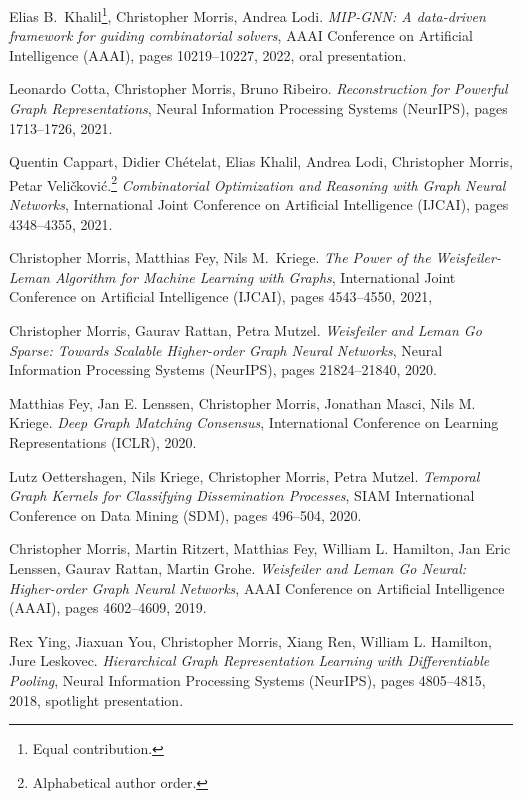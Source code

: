\documentclass[11pt, a4paper, DIV=14, headings=small]{scrartcl}
\begin{document}
\begin{thebibliography}{15}
		Elias B.\, Khalil\footnote{Equal contribution.}, Christopher Morris{\footnotemark[1]}, Andrea Lodi.
		\emph{MIP-GNN: A data-driven framework for guiding combinatorial solvers},
		AAAI Conference on Artificial Intelligence (AAAI), pages 10219--10227, 2022, oral presentation.
		
		Leonardo Cotta, Christopher Morris, Bruno Ribeiro.
		\emph{Reconstruction for Powerful Graph Representations},
		Neural Information Processing Systems (NeurIPS), pages 1713--1726, 2021.
		
		Quentin Cappart, Didier Chételat, Elias Khalil, Andrea Lodi, Christopher Morris, Petar Veli\v{c}kovi\'{c}.\footnote{Alphabetical author order.}
		\emph{Combinatorial Optimization and Reasoning with Graph Neural Networks},
		International Joint Conference on Artificial Intelligence (IJCAI), pages 4348--4355, 2021.
		
		Christopher Morris, Matthias Fey, Nils M.~Kriege.
		\emph{The Power of the Weisfeiler-Leman Algorithm for Machine Learning with Graphs},
		International Joint Conference on Artificial Intelligence (IJCAI), pages 4543--4550, 2021,
		
		Christopher Morris, Gaurav Rattan, Petra Mutzel.
		\emph{Weisfeiler and Leman Go Sparse: Towards Scalable Higher-order Graph Neural Networks},
		Neural Information Processing Systems (NeurIPS), pages 21824--21840, 2020.
		
		Matthias Fey, Jan E. Lenssen, Christopher Morris, Jonathan Masci, Nils M. Kriege.
		\emph{Deep Graph Matching Consensus},
		International Conference on Learning Representations (ICLR), 2020.
		
		Lutz Oettershagen, Nils Kriege, Christopher Morris, Petra Mutzel.
		\emph{Temporal Graph Kernels for Classifying Dissemination Processes},
		SIAM International Conference on Data Mining (SDM), pages 496--504, 2020.
		
		Christopher Morris, Martin Ritzert, Matthias Fey, William L. Hamilton, Jan Eric Lenssen, Gaurav Rattan, Martin Grohe.
		\newblock \emph{Weisfeiler and Leman Go Neural: Higher-order Graph Neural Networks},
		\newblock AAAI Conference on Artificial Intelligence (AAAI), pages 4602--4609, 2019.
		
		Rex Ying, Jiaxuan You, Christopher Morris, Xiang Ren, William L. Hamilton, Jure Leskovec.
		\emph{Hierarchical Graph Representation Learning with Differentiable Pooling},
		Neural Information Processing Systems (NeurIPS), pages 4805--4815, 2018, spotlight presentation.
		

\end{thebibliography}
\end{document}
